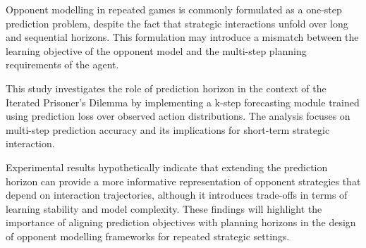 \abstracteng
Opponent modelling in repeated games is commonly formulated as a one-step prediction problem, despite the fact that strategic interactions unfold over long and sequential horizons. This formulation may introduce a mismatch between the learning objective of the opponent model and the multi-step planning requirements of the agent.

This study investigates the role of prediction horizon in the context of the Iterated Prisoner's Dilemma by implementing a k-step forecasting module trained using prediction loss over observed action distributions. The analysis focuses on multi-step prediction accuracy and its implications for short-term strategic interaction.

Experimental results hypothetically indicate that extending the prediction horizon can provide a more informative representation of opponent strategies that depend on interaction trajectories, although it introduces trade-offs in terms of learning stability and model complexity. These findings will highlight the importance of aligning prediction objectives with planning horizons in the design of opponent modelling frameworks for repeated strategic settings.
\endabstracteng

